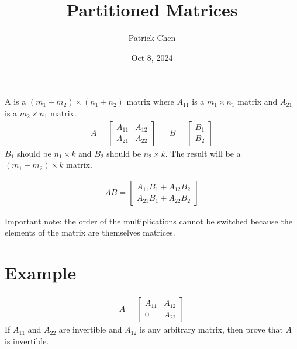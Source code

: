 \documentclass{article}
\title{Partitioned Matrices}
\author{Patrick Chen}
\date{Oct 8, 2024}
\theoremstyle{mytheoremstyle}
\theoremstyle{mytheoremstyle}
\theoremstyle{myproblemstyle}
\begin{document}
    \maketitle
    A is a $(m_1+m_2)\times (n_1+n_2)$ matrix where $A_{11}$ is a $m_1\times
    n_1$ matrix and $A_{21}$ is a $m_2\times n_1$ matrix.
    \begin{align*}
        A = \begin{bmatrix}
            A_{11} & A_{12} \\
            A_{21} & A_{22}
        \end{bmatrix} &&
        B = \begin{bmatrix}
            B_1 \\
            B_2
        \end{bmatrix}
    \end{align*}
    $B_1$ should be $n_1\times k$ and $B_2$ should be $n_2\times k$. The result
    will be a $(m_1 + m_2)\times k$ matrix.

    \begin{align*}
        AB = \begin{bmatrix}
            A_{11}B_1 + A_{12}B_2 \\
            A_{21}B_1 + A_{22}B_2
        \end{bmatrix}
    \end{align*}

    Important note: the order of the multiplications cannot be switched because
    the elements of the matrix are themselves matrices.

    \section*{Example}
    \begin{align*}
        A = \begin{bmatrix}
            A_{11} & A_{12} \\
            0      & A_{22}
        \end{bmatrix}
    \end{align*}
    If $A_{11}$ and $A_{22}$ are invertible and $A_{12}$ is any arbitrary
    matrix, then prove that $A$ is invertible.
\end{document}
